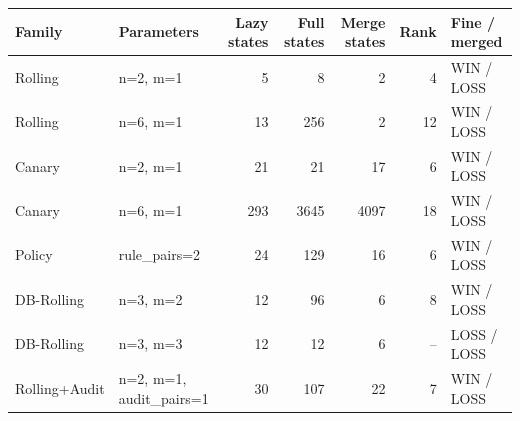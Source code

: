 \begin{tabular}{llrrrrl}
\toprule
Family & Parameters & Lazy states & Full states & Merge states & Rank & Fine / merged \\
\midrule
Rolling & n=2, m=1 & 5 & 8 & 2 & 4 & WIN / LOSS \\
Rolling & n=6, m=1 & 13 & 256 & 2 & 12 & WIN / LOSS \\
Canary & n=2, m=1 & 21 & 21 & 17 & 6 & WIN / LOSS \\
Canary & n=6, m=1 & 293 & 3645 & 4097 & 18 & WIN / LOSS \\
Policy & rule\_pairs=2 & 24 & 129 & 16 & 6 & WIN / LOSS \\
DB-Rolling & n=3, m=2 & 12 & 96 & 6 & 8 & WIN / LOSS \\
DB-Rolling & n=3, m=3 & 12 & 12 & 6 & -- & LOSS / LOSS \\
Rolling+Audit & n=2, m=1, audit\_pairs=1 & 30 & 107 & 22 & 7 & WIN / LOSS \\
\bottomrule
\end{tabular}
